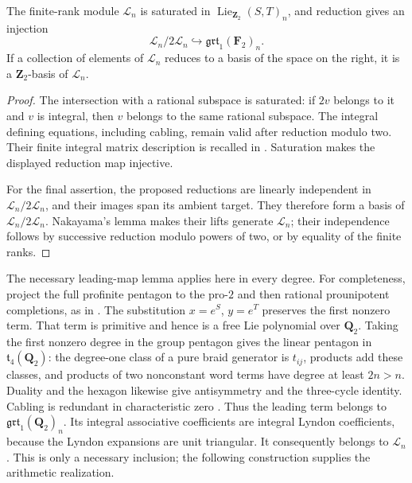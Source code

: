 \begin{lemma}\label{lem:fr-integral-leading-basis}
The finite-rank module $\mathcal L_n$ is saturated in
$\operatorname{Lie}_{\mathbf Z_2}(S,T)_n$, and reduction gives
an injection
\[
 \mathcal L_n/2\mathcal L_n
       \hookrightarrow\mathfrak{grt}_1(\mathbf F_2)_n.
\]
If a collection of elements of $\mathcal L_n$ reduces to a
basis of the space on the right, it is a $\mathbf Z_2$-basis
of $\mathcal L_n$.
\end{lemma}

\begin{proof}
The intersection with a rational subspace is saturated:
if $2v$ belongs to it and $v$ is integral, then $v$ belongs
to the same rational subspace. The integral defining equations,
including cabling, remain valid after reduction modulo two.
Their finite integral matrix description is recalled in
\cite[\S1.1, p.~2]{Willwacher}. Saturation makes the displayed
reduction map injective.

For the final assertion, the proposed reductions are linearly
independent in $\mathcal L_n/2\mathcal L_n$, and their images
span its ambient target. They therefore form a basis of
$\mathcal L_n/2\mathcal L_n$. Nakayama's lemma makes their lifts
generate $\mathcal L_n$; their independence follows by
successive reduction modulo powers of two, or by equality of
the finite ranks.
\end{proof}

The necessary leading-map lemma applies here in every degree.
For completeness, project the full profinite pentagon to the
pro-$2$ and then rational prounipotent completions, as in
\cite[\S3, p.~554, immediately before Corollary~12]{Furusho2010}.
The substitution $x=e^S$, $y=e^T$ preserves the first nonzero
term. That term is primitive and hence is a free Lie polynomial
over $\mathbf Q_2$. Taking the first nonzero degree in the group
pentagon gives the linear pentagon in
$\mathfrak t_4(\mathbf Q_2)$: the degree-one class of a pure
braid generator is $t_{ij}$, products add these classes, and
products of two nonconstant word terms have degree at least
$2n>n$. Duality and the hexagon likewise give antisymmetry
and the three-cycle identity. Cabling is redundant in
characteristic zero
\cite[p.~1, after equation~(6)]{Willwacher}.
Thus the leading term belongs to
$\mathfrak{grt}_1(\mathbf Q_2)_n$.
Its integral associative coefficients are integral Lyndon
coefficients, because the Lyndon expansions are unit triangular.
It consequently belongs to $\mathcal L_n$. This is only a
necessary inclusion; the following construction supplies the
arithmetic realization.

